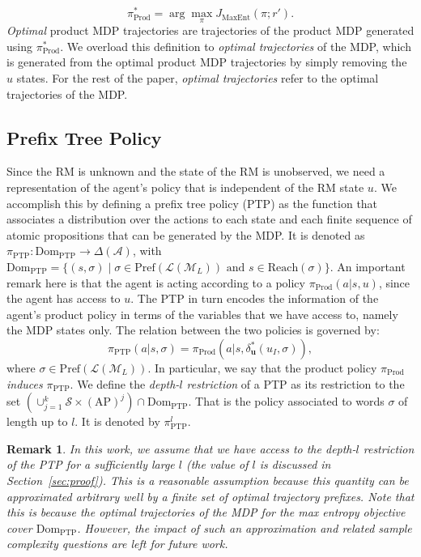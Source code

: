 \documentclass[letterpaper, 10 pt, conference]{ieeeconf}
\newcommand{\lnm}{\mathcal{L}(\mathcal{M}_L)}
\newcommand{\ptp}{\pi_{\mathrm{PTP}}}
\newcommand{\plnm}{\mathrm{Pref}(\lnm)}
\newtheorem{remark}{\textbf{Remark}}
\newcommand{\sectionref}[1]{Section~\ref{#1}}
\begin{document}
\begin{equation}\label{eq:opt_prob}
    \pi_{\mathrm{Prod}}^* = \arg \max\limits_{\pi} J_{\mathrm{MaxEnt}}(\pi;r').
\end{equation}
\emph{Optimal} product MDP trajectories are trajectories of the product MDP generated using $\pi_{\mathrm{Prod}}^*$. We overload this definition to \emph{optimal trajectories} of the MDP, which is generated from the optimal product MDP trajectories by simply removing the $u$ states. For the rest of the paper, \emph{optimal trajectories} refer to the optimal trajectories of the MDP.

\subsection{Prefix Tree Policy}
Since the RM is unknown and the state of the RM is unobserved, we need a representation of the agent's policy that is independent of the RM state $u$. We accomplish this by defining a prefix tree policy (PTP) as the function that associates a distribution over the actions to each state and each finite sequence of atomic propositions that can be generated by the MDP. It is denoted as $\pi_{\mathrm{PTP}}: \mathrm{Dom_{PTP}} \to \Delta(\mathcal{A})$, with $\mathrm{Dom_{PTP}}=\{(s,\sigma)\mid \sigma\in \mathrm{Pref}(\mathcal{L}(\mathcal{M}_L)) \text{ and } s\in\mathrm{Reach}(\sigma) \}$. An important remark here is that the agent is acting according to a policy $\pi_{\mathrm{Prod}}(a|s,u)$, since the agent has access to $u$. The PTP in turn encodes the information of the agent's product policy in terms of the variables that we have access to, namely the MDP states only. The relation between the two policies is governed by:
\begin{equation}\label{eq:induced}
    \pi_{\mathrm{PTP}} (a|s,\sigma) = \pi_{\mathrm{Prod}}(a|s, \delta_\textbf{u}^*(u_I, \sigma)),
\end{equation}
where $\sigma \in \plnm$. In particular, we say that the product policy $\pi_{\mathrm{Prod}}$ \emph{induces}  $\pi_{\mathrm{PTP}}$. We define the \emph{depth-$l$ restriction} of a PTP as its restriction to the set $\left(\cup_{j=1}^{k}\mathcal{S} \times (\mathrm{AP})^j\right)\cap\mathrm{Dom_{PTP}}$. That is the policy associated to words $\sigma$ of length up to $l$. It is denoted by $\ptp^{l}$.

\begin{remark}
In this work, we assume that we have access to the depth-$l$ restriction of the PTP for a sufficiently large $l$ (the value of $l$ is discussed in \sectionref{sec:proof}). This is a reasonable assumption because this quantity can be approximated arbitrary well by a finite set of optimal trajectory prefixes. Note that this is because the optimal trajectories of the MDP for the max entropy objective cover $\mathrm{Dom_{PTP}}$. However, the impact of such an approximation and related sample complexity questions are left for future work.
\end{remark}
\end{document}

